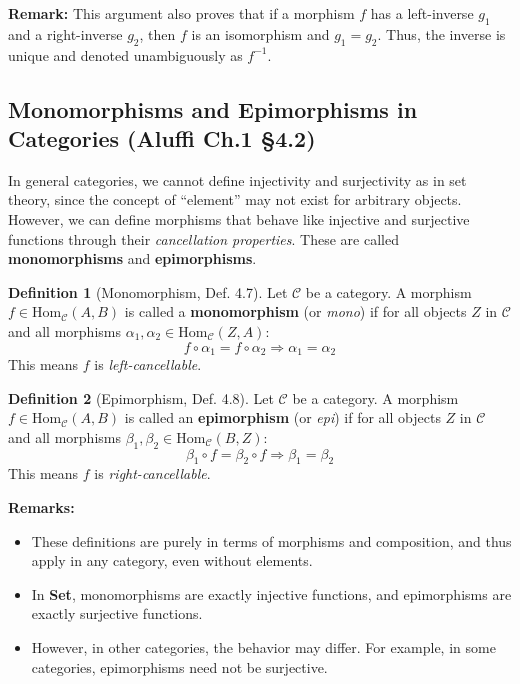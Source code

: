\documentclass[10pt]{article}
\theoremstyle{plain}
\theoremstyle{definition}
\newtheorem{definition}{Definition}[section]
\begin{document}
  \noindent
  \textbf{Remark:} This argument also proves that if a morphism $f$ has a left-inverse $g_1$ and a right-inverse $g_2$, then $f$ is an isomorphism and $g_1 = g_2$. Thus, the inverse is unique and denoted unambiguously as $f^{-1}$.
  
  \subsection*{Monomorphisms and Epimorphisms in Categories (Aluffi Ch.1 §4.2)}
  
  In general categories, we cannot define injectivity and surjectivity as in set theory, since the concept of ``element'' may not exist for arbitrary objects. However, we can define morphisms that behave like injective and surjective functions through their \emph{cancellation properties}. These are called \textbf{monomorphisms} and \textbf{epimorphisms}.
  
  \begin{definition}[Monomorphism, Def. 4.7]
  	Let $\mathcal{C}$ be a category. A morphism $f \in \mathrm{Hom}_{\mathcal{C}}(A, B)$ is called a \textbf{monomorphism} (or \emph{mono}) if for all objects $Z$ in $\mathcal{C}$ and all morphisms $\alpha_1, \alpha_2 \in \mathrm{Hom}_{\mathcal{C}}(Z, A)$:
  	\[
  	f \circ \alpha_1 = f \circ \alpha_2 \Rightarrow \alpha_1 = \alpha_2
  	\]
  	This means $f$ is \emph{left-cancellable}.
  \end{definition}
  
  \begin{definition}[Epimorphism, Def. 4.8]
  	Let $\mathcal{C}$ be a category. A morphism $f \in \mathrm{Hom}_{\mathcal{C}}(A, B)$ is called an \textbf{epimorphism} (or \emph{epi}) if for all objects $Z$ in $\mathcal{C}$ and all morphisms $\beta_1, \beta_2 \in \mathrm{Hom}_{\mathcal{C}}(B, Z)$:
  	\[
  	\beta_1 \circ f = \beta_2 \circ f \Rightarrow \beta_1 = \beta_2
  	\]
  	This means $f$ is \emph{right-cancellable}.
  \end{definition}
  
  \vspace{1em}
  \textbf{Remarks:}
  \begin{itemize}
  	\item These definitions are purely in terms of morphisms and composition, and thus apply in any category, even without elements.
  	\item In \textbf{Set}, monomorphisms are exactly injective functions, and epimorphisms are exactly surjective functions.
  	\item However, in other categories, the behavior may differ. For example, in some categories, epimorphisms need not be surjective.
  \end{itemize}
  
\end{document}
